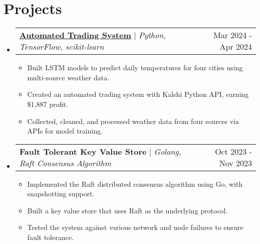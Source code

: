 \documentclass[letterpaper,11pt]{article}
\makeatletter
\newcommand{\resumeItem}[1]{
  \item\small{
    {#1 \vspace{-2pt}}
  }
}
\newcommand{\resumeProjectHeading}[2]{
    \item
    \begin{tabular*}{0.97\textwidth}{l@{\extracolsep{\fill}}r}
      \small#1 & #2 \\
    \end{tabular*}\vspace{-7pt}
}
\newcommand{\resumeSubHeadingListStart}{\begin{itemize}[leftmargin=0.15in, label={}]}
\newcommand{\resumeSubHeadingListEnd}{\end{itemize}}
\newcommand{\resumeItemListStart}{\begin{itemize}}
\newcommand{\resumeItemListEnd}{\end{itemize}\vspace{-5pt}}
\makeatother
\begin{document}
\section{Projects}
    \resumeSubHeadingListStart
      \resumeProjectHeading
          { \href{https://github.com/pranavgoyanka/cs542-common-task}{\underline{\textbf{Automated Trading System}}} $|$ \emph{Python, TensorFlow, scikit-learn}}{Mar 2024 - Apr 2024}
          \resumeItemListStart
            \resumeItem{Built LSTM models to predict daily temperatures for four cities using multi-source weather data.}
            \resumeItem{Created an automated trading system with Kalshi Python API, earning \$1,887 profit.}
            \resumeItem{Collected, cleaned, and processed weather data from four sources via APIs for model training.}
          \resumeItemListEnd
      \resumeProjectHeading
          {\textbf{Fault Tolerant Key Value Store} $|$ \emph{Golang, Raft Consensus Algorithm}}{Oct 2023 - Nov 2023}
          \resumeItemListStart
            \resumeItem{Implemented the Raft distributed consensus algorithm using Go, with snapshotting support.}
            \resumeItem{Built a key value store that uses Raft as the underlying protocol.}
            \resumeItem{Tested the system against various network and node failures to ensure fault tolerance.}
          \resumeItemListEnd
    \resumeSubHeadingListEnd



%

\end{document}
